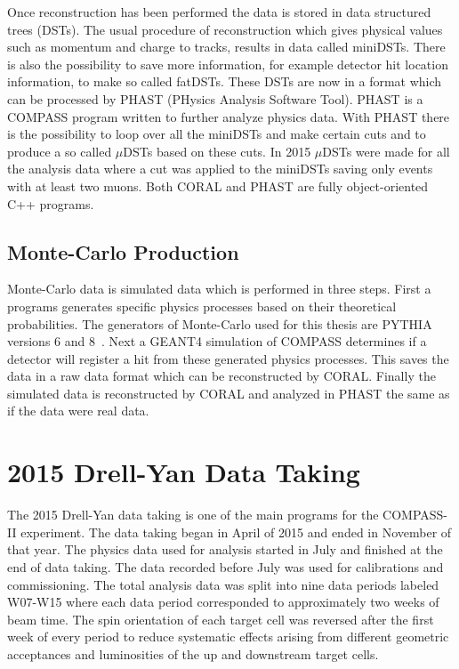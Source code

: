 Once reconstruction has been performed the data is stored in data structured
trees (DSTs).  The usual procedure of reconstruction which gives physical values
such as momentum and charge to tracks, results in data called miniDSTs.  There
is also the possibility to save more information, for example detector hit
location information, to make so called fatDSTs.  These DSTs are now in a format
which can be processed by PHAST (PHysics Analysis Software Tool).  PHAST is a
COMPASS program written to further analyze physics data.  With PHAST there is
the possibility to loop over all the miniDSTs and make certain cuts and to
produce a so called $\mu$DSTs based on these cuts.  In 2015 $\mu$DSTs were made
for all the analysis data where a cut was applied to the miniDSTs saving only
events with at least two muons.  Both CORAL and PHAST are fully object-oriented
C++ programs. \par

\subsection{Monte-Carlo Production}
Monte-Carlo data is simulated data which is performed in three steps.  First a
programs generates specific physics processes based on their theoretical
probabilities.  The generators of Monte-Carlo used for this thesis are PYTHIA
versions 6 and 8~\cite{pythia}.  Next a GEANT4 simulation of COMPASS determines
if a detector will register a hit from these generated physics processes.  This
saves the data in a raw data format which can be reconstructed by CORAL.
Finally the simulated data is reconstructed by CORAL and analyzed in PHAST the
same as if the data were real data. \par


\section{2015 Drell-Yan Data Taking}
The 2015 Drell-Yan data taking is one of the main programs for the COMPASS-II
experiment.  The data taking began in April of 2015 and ended in November of
that year.  The physics data used for analysis started in July and finished at
the end of data taking.  The data recorded before July was used for calibrations
and commissioning.  The total analysis data was split into nine data periods
labeled W07-W15 where each data period corresponded to approximately two weeks
of beam time. The spin orientation of each target cell was reversed after the
first week of every period to reduce systematic effects arising from different
geometric acceptances and luminosities of the up and downstream target
cells. \par

